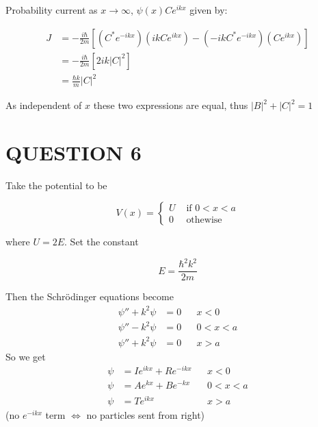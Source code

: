 \documentclass[a4paper]{article}
\begin{document}
Probability current as $ x \to \infty $, $ \psi(x) C e^{ikx} $ given by:

\begin{align*}
J & = - \frac{i \hbar }{2m} \left[   (C^{*} e^{-ikx}  )(ik C e^{ikx}  )   - ( - i k C^{*} e^{-i k x})(C e^{ikx})  \right] \\
& = - \frac{i \hbar }{2m} \left[ 2ik | C |^{2}  \right] \\
& = \frac{\hbar k}{m} | C |^{2} 
\end{align*}

As independent of $ x $ these two expressions are equal, thus $ | B |^{2} + | C |^{2} = 1 $





\section{QUESTION 6}

Take the potential to be 

\begin{center}
\end{center}

\[ V(x) = \begin{cases} U  & \text{ if } 0 < x < a \\ 0  & \text{ othewise } \end{cases} \]

where $ U = 2E $. Set the constant

\[
E = \frac{\hbar^2 k^2}{2m}
\]

Then the Schr\"odinger equations become
\begin{align*}
\psi'' + k^2 \psi &= 0 && x < 0\\
\psi'' - k^2 \psi &= 0 && 0 < x < a\\
\psi'' + k^2 \psi &= 0 && x > a
\end{align*}
So we get
\begin{align*}
\psi &= I e^{ikx} + Re^{-ikx}&& x < 0\\
\psi &= Ae^{k x} + Be^{-k x}&& 0 < x < a\\
\psi &= Te^{ikx} && x > a
\end{align*}
(no $ e^{-ikx} $ term $ \iff $ no particles sent from right)
\end{document}
